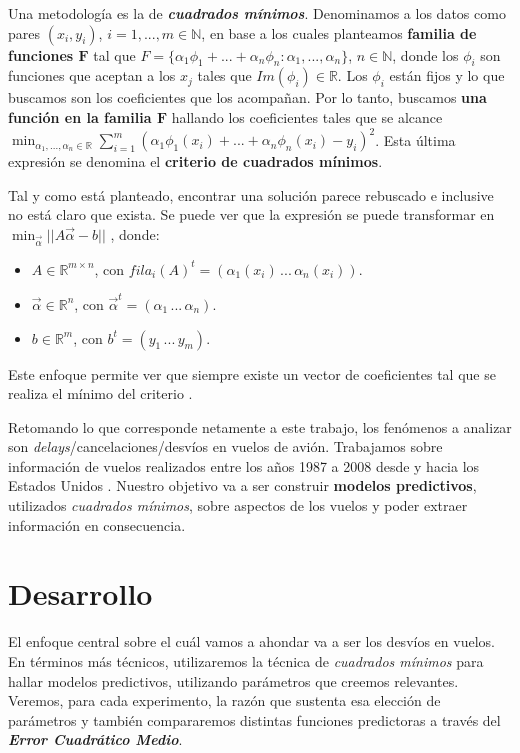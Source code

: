 \documentclass{endm}
\newcommand{\Nat}{{\mathbb N}}
\newcommand{\Real}{{\mathbb R}}
\begin{document}
Una metodolog\'ia es la de \textbf{\textit{cuadrados m\'inimos}}. Denominamos a los datos como pares $(x_i, y_i)$, $i = 1, ..., m \in \Nat$, en base a los cuales planteamos \textbf{familia de funciones $\mathbf{F}$} tal que $F = \{\alpha_1\phi_1 + ... + \alpha_n\phi_n : \alpha_1, ..., \alpha_n\}$, $n \in \Nat$, donde los $\phi_i$ son funciones que aceptan a los $x_j$ tales que $Im(\phi_i) \in \Real$. Los $\phi_i$ est\'an fijos y lo que buscamos son los coeficientes que los acompa\~nan. Por lo tanto, buscamos \textbf{una funci\'on en la familia $\mathbf{F}$} hallando los coeficientes tales que se alcance $\min_{\alpha_1, ..., \alpha_n \in \Real} \sum_{i = 1}^{m} (\alpha_1\phi_1(x_i) + ... + \alpha_n\phi_n(x_i) - y_i)^{2}$. Esta \'ultima expresi\'on se denomina el \textbf{criterio de cuadrados m\'inimos}.

Tal y como est\'a planteado, encontrar una soluci\'on parece rebuscado e inclusive no est\'a claro que exista. Se puede ver que la expresi\'on se puede transformar en $\min_{\vec{\alpha}}||A\vec{\alpha} - b||$ \cite{db}, donde:

\begin{itemize}
\item $A \in \Real^{m \times n}$, con $fila_i(A)^{t} = (\alpha_1(x_i) \, ... \, \alpha_n(x_i))$.
\item $\vec{\alpha} \in \Real^{n}$, con $\vec{\alpha}^{t} = (\alpha_1 \, ... \, \alpha_n)$.
\item $b \in \Real^{m}$, con $b^{t} = (y_1 \, ... \, y_m)$.
\end{itemize}

Este enfoque permite ver que siempre existe un vector de coeficientes tal que se realiza el m\'inimo del criterio \cite{db}.

Retomando lo que corresponde netamente a este trabajo, los fen\'omenos a analizar son \textit{delays}/cancelaciones/desv\'ios en vuelos de avi\'on. Trabajamos sobre informaci\'on de vuelos realizados entre los a\~nos 1987 a 2008 desde y hacia los Estados Unidos \cite{statComp}. Nuestro objetivo va a ser construir \textbf{modelos predictivos}, utilizados \textit{cuadrados m\'inimos}, sobre aspectos de los vuelos y poder extraer informaci\'on en consecuencia.

\section{Desarrollo}

El enfoque central sobre el cu\'al vamos a ahondar va a ser los desv\'ios en vuelos. En t\'erminos m\'as t\'ecnicos, utilizaremos la t\'ecnica de \textit{cuadrados m\'inimos} para hallar modelos predictivos, utilizando par\'ametros que creemos relevantes. Veremos, para cada experimento, la raz\'on que sustenta esa elecci\'on de par\'ametros y tambi\'en compararemos distintas funciones predictoras a trav\'es del \textbf{\textit{Error Cuadr\'atico Medio}}.
\end{document}
